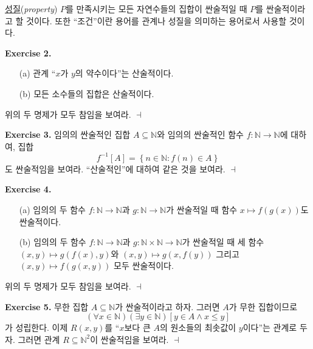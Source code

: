 \documentclass[12pt]{paper}
\newenvironment{context}[1][]
{ \noindent \textbf{{#1}.} }
{ \hfill $ \dashv $ }
\begin{document}
\underline{성질}(\textit{property}) $P$를 만족시키는 모든 자연수들의 집합이 싼술적일 때 $P$를 싼술적이라고 할 것이다.
또한 ``조건''이란 용어를 관계나 성질을 의미하는 용어로서 사용할 것이다.

\begin{context}[Exercise 2]
\begin{enumerate}
\item[(a)] 관계 ``$x$가 $y$의 약수이다''는 산술적이다.
\item[(b)] 모든 소수들의 집합은 산술적이다.
\end{enumerate}

위의 두 명제가 모두 참임을 보여라.
\end{context}

\begin{context}[Exercise 3]
임의의 싼술적인 집합 $A \subseteq \mathbb{N}$와 임의의 싼술적인 함수 $f : \mathbb{N} \to \mathbb{N}$에 대하여, 집합 $$f^{-1} \left[ A \right] = \left\{ n \in \mathbb{N} : f \left( n \right) \in A \right\}$$도 싼술적임을 보여라.
``산술적인''에 대하여 같은 것을 보여라.
\end{context}

\begin{context}[Exercise 4]
\begin{enumerate}
\item[(a)] 임의의 두 함수 $f : \mathbb{N} \to \mathbb{N}$과 $g : \mathbb{N} \to \mathbb{N}$가 싼술적일 때
함수 $x \mapsto f \left( g \left( x \right) \right)$도 싼술적이다.
\item[(b)] 임의의 두 함수 $f : \mathbb{N} \to \mathbb{N}$과 $g : \mathbb{N} \times \mathbb{N} \to \mathbb{N}$가 싼술적일 때
세 함수 $ \left( x , y \right) \mapsto g \left( f \left( x \right) , y \right) $와 $ \left( x , y \right) \mapsto g \left( x , f \left( y \right) \right) $ 그리고 $ \left( x , y \right) \mapsto f \left( g \left( x , y \right) \right) $ 모두 싼술적이다.
\end{enumerate}

위의 두 명제가 모두 참임을 보여라.
\end{context}

\begin{context}[Exercise 5]
무한 집합 $A \subseteq \mathbb{N}$가 싼술적이라고 하자.
그러면 $A$가 무한 집합이므로 $$\left( \forall x \in \mathbb{N} \right) \left( \exists y \in \mathbb{N} \right) \left[ y \in A \land x \leq y \right]$$가 성립한다.
이제 $R \left( x , y \right)$를 ``$x$보다 큰 $A$의 원소들의 최솟값이 $y$이다''는 관계로 두자.
그러면 관계 $R \subseteq \mathbb{N}^{2}$이 싼술적임을 보여라.
\end{context}
\end{document}
